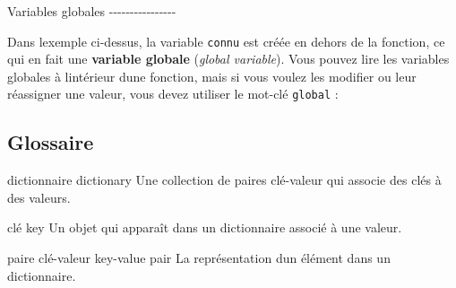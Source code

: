 \begin{Shaded}
\begin{Highlighting}[]
\OperatorTok{=}\NormalTok{ \{}\NormalTok{: }\NormalTok{, }\NormalTok{: }\NormalTok{\}}

\OperatorTok{=}\OperatorTok{{-}}\NormalTok{) }\OperatorTok{+}\OperatorTok{{-}}\NormalTok{)}
\OperatorTok{=}
\end{Highlighting}
\end{Shaded}

Variables globales -\/-\/-\/-\/-\/-\/-\/-\/-\/-\/-\/-\/-\/-\/-\/-

Dans l\textquotesingle exemple ci-dessus, la variable \texttt{connu} est
créée en dehors de la fonction, ce qui en fait une \textbf{variable
globale} (\emph{global variable}). Vous pouvez lire les variables
globales à l\textquotesingle intérieur d\textquotesingle une fonction,
mais si vous voulez les modifier ou leur réassigner une valeur, vous
devez utiliser le mot-clé \texttt{global} :

\begin{Shaded}
\begin{Highlighting}[]
\OperatorTok{=} 

\OperatorTok{+=} 
\end{Highlighting}
\end{Shaded}

\hypertarget{glossaire}{%
\subsection{Glossaire}\label{glossaire}}

dictionnaire dictionary Une collection de paires clé-valeur qui associe
des clés à des valeurs.

clé key Un objet qui apparaît dans un dictionnaire associé à une valeur.

paire clé-valeur key-value pair La représentation d\textquotesingle un
élément dans un dictionnaire.

